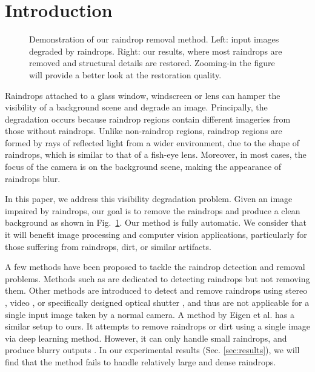 \documentclass[10pt,twocolumn,letterpaper]{article}
\def\WIDTHTWO{0.45\linewidth}
\begin{document}
\section{Introduction}

\begin{figure}
	\centering
	\vfill\vspace{-2.5mm}
	\vfill\vspace{-2.5mm}
	\caption{Demonstration of our raindrop removal method. Left: input images degraded by raindrops. Right: our results, where most raindrops are removed and structural details are restored. Zooming-in the figure will provide a better look at the restoration quality.}
	\label{fig:trailer}
\end{figure}

Raindrops attached to a glass window, windscreen or lens can hamper the visibility of a background scene and degrade an image. Principally, the degradation occurs because raindrop regions contain different  imageries from those without raindrops.  Unlike non-raindrop regions,  raindrop regions are formed by rays of reflected light from a wider environment, due to the shape of raindrops, which is similar to that of a fish-eye lens. Moreover, in most cases, the focus of the camera is on the background scene, making the appearance of raindrops blur.

In this paper, we address this visibility degradation problem. Given an image impaired by raindrops, our goal is to remove the raindrops and produce a clean background as shown in Fig.~\ref{fig:trailer}. Our method is fully automatic. We consider that it will benefit image processing and computer vision applications, particularly for those suffering from raindrops, dirt, or similar artifacts.

A few methods have been proposed to tackle the raindrop detection and removal problems. Methods such as \cite{roser2009video,roser2010realistic,kurihata2005rainy} are dedicated to detecting raindrops but not removing them. Other methods are introduced to detect and remove raindrops using stereo \cite{tanaka2006removal}, video \cite{yamashita2009noises,you2016adherent}, or specifically designed optical shutter \cite{hara2009removal}, and thus are not applicable for a single input image taken by a normal camera. A method by Eigen et al. \cite{eigen2013restoring} has a similar setup to ours. It attempts to remove raindrops or dirt using a single image via deep learning method. However, it can only handle small raindrops, and produce blurry outputs \cite{you2016adherent}. In our experimental results (Sec. \ref{sec:results}), we will find that the method fails to handle relatively large and dense raindrops.
\end{document}
